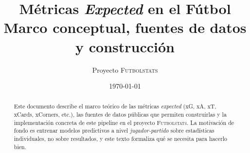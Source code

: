 \documentclass[11pt,a4paper]{article}
\title{
  Métricas \emph{Expected} en el Fútbol \\
  \large Marco conceptual, fuentes de datos y construcción
}
\author{Proyecto \textsc{Futbolstats}}
\date{\today}
\begin{document}
\maketitle
\begin{abstract}
\noindent
Este documento describe el marco teórico de las métricas \emph{expected} (xG, xA, xT, xCards, xCorners, etc.), las fuentes de datos públicas que permiten construirlas y la implementación concreta de este pipeline en el proyecto \textsc{Futbolstats}. La motivación de fondo es entrenar modelos predictivos a nivel \emph{jugador-partido} sobre estadísticas individuales, no sobre resultados, y este texto formaliza qué se necesita para hacerlo bien.
\end{abstract}

\tableofcontents
\clearpage








\end{document}
